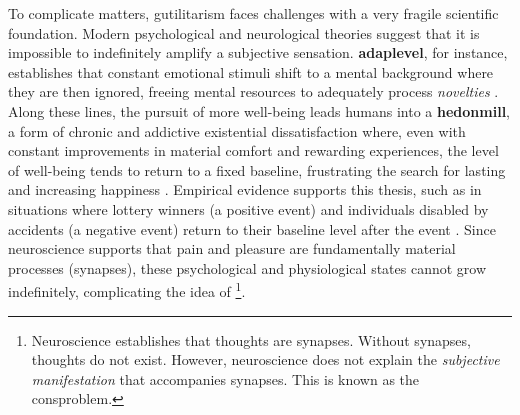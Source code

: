 \documentclass[./main_en.tex]{subfiles}
\begin{document}
\par To complicate matters, \gls{gutilitarism} faces challenges with a very fragile scientific foundation. Modern psychological and neurological theories suggest that it is impossible to indefinitely amplify a subjective sensation. \textbf{\gls{adaplevel}}, for instance, establishes that constant emotional stimuli shift to a mental background where they are then ignored, freeing mental resources to adequately process \textit{novelties} \cite{Edwards_2018}. Along these lines, the pursuit of more well-being leads humans into a \textbf{\gls{hedonmill}}, a form of chronic and addictive existential dissatisfaction where, even with constant improvements in material comfort and rewarding experiences, the level of well-being tends to return to a fixed baseline, frustrating the search for lasting and increasing happiness \cite{Diener2009}. Empirical evidence supports this thesis, such as in situations where lottery winners (a positive event) and individuals disabled by accidents (a negative event) return to their baseline level after the event \cite{Brickman_1978}. Since neuroscience supports that pain and pleasure are fundamentally material processes (synapses), these psychological and physiological states cannot grow indefinitely, complicating the idea of \footnote{Neuroscience establishes that thoughts are synapses. Without synapses, thoughts do not exist. However, neuroscience does not explain the \textit{subjective manifestation} that accompanies synapses. This is known as the \gls{consproblem}.}.
\end{document}
